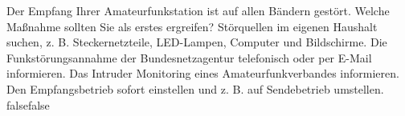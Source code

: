     {Der Empfang Ihrer Amateurfunkstation ist auf allen Bändern gestört. Welche Maßnahme sollten Sie als erstes ergreifen?}
    {Störquellen im eigenen Haushalt suchen, z. B. Steckernetzteile, LED-Lampen, Computer und Bildschirme.}
    {Die Funkstörungsannahme der Bundesnetzagentur telefonisch oder per E-Mail informieren.}
    {Das Intruder Monitoring eines Amateurfunkverbandes informieren.}
    {Den Empfangsbetrieb sofort einstellen und z. B. auf Sendebetrieb umstellen.}
    {false}{false}
